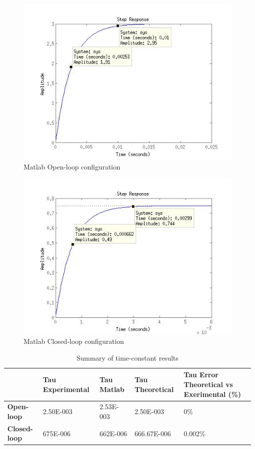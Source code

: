 \documentclass[12pt]{article}
\begin{document}
\begin{figure}[ht]
\centering
\includegraphics[width=7in]{MatlabFreqRespOpen.jpg}
\caption{Matlab Open-loop configuration}
\label{fig:matlab-open-loop}
\end{figure}


\begin{figure}[ht]
\centering
\includegraphics[width=7in]{MatlabFreqRespClosed.jpg}
\caption{Matlab Closed-loop configuration}
\label{fig:matlab-closed-loop}
\end{figure}

\begin{table}[ht]
\centering
    \begin{tabular}{|l|p{3cm}|p{3cm}|p{3cm}|p{3cm}|}
        \hline
        & \textbf{Tau Experimental} & \textbf{Tau Matlab} & \textbf{Tau Theoretical} & \textbf{Tau Error Theoretical vs Exerimental (\%)}\\
        \hline
        \textbf{Open-loop} & 2.50E-003 & 2.53E-003 & 2.50E-003 & 0\%\\
        \hline
        \textbf{Closed-loop} & 675E-006  & 662E-006 & 666.67E-006 & 0.002\%\\
        \hline
    \end{tabular}
    \caption{Summary of time-constant results}
    \label{tab:tau-summary}
\end{table}
\end{document}
